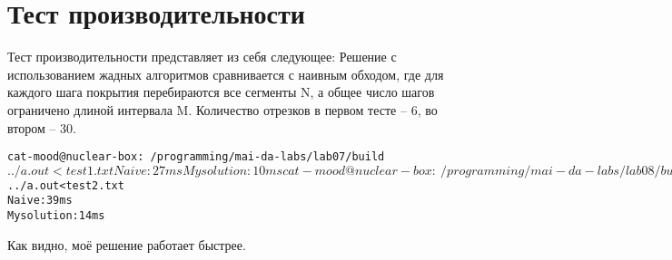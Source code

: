 \section{Тест производительности}

Тест производительности представляет из себя следующее: 
Решение с использованием жадных алгоритмов сравнивается с наивным обходом, где 
для каждого шага покрытия перебираются все сегменты N, а общее число шагов ограничено длиной интервала 
M.
Количество отрезков в первом тесте -- 6, во втором -- 30.

\begin{alltt}
    cat-mood@nuclear-box:~/programming/mai-da-labs/lab07/build$ ../a.out < test1.txt
    Naive: 27 ms
    My solution: 10 ms

    cat-mood@nuclear-box:~/programming/mai-da-labs/lab08/build$ ../a.out < test2.txt
    Naive: 39 ms
    My solution: 14 ms
\end{alltt}

Как видно, моё решение работает быстрее.
\pagebreak
